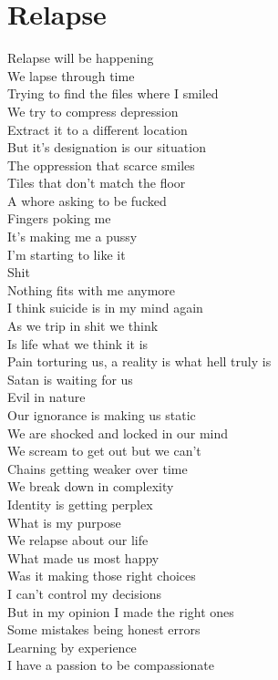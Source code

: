 \documentclass[12pt, b5paper]{article}
\begin{document}
\section{Relapse}
Relapse will be happening
\\We lapse through time
\\Trying to find the files where I smiled
\\We try to compress depression
\\Extract it to a different location
\\But it's designation is our situation
\\The oppression that scarce smiles
\\Tiles that don't match the floor
\\A whore asking to be fucked
\\Fingers poking me
\\It's making me a pussy
\\I'm starting to like it
\\Shit
\\Nothing fits with me anymore
\\I think suicide is in my mind again
\\As we trip in shit we think
\\Is life what we think it is
\\Pain torturing us, a reality is what hell truly is
\\Satan is waiting for us
\\Evil in nature
\\Our ignorance is making us static
\\We are shocked and locked in our mind
\\We scream to get out but we can't
\\Chains getting weaker over time
\\We break down in complexity
\\Identity is getting perplex
\\What is my purpose
\\We relapse about our life
\\What made us most happy
\\Was it making those right choices
\\I can't control my decisions
\\But in my opinion I made the right ones
\\Some mistakes being honest errors
\\Learning by experience
\\I have a passion to be compassionate
\end{document}
